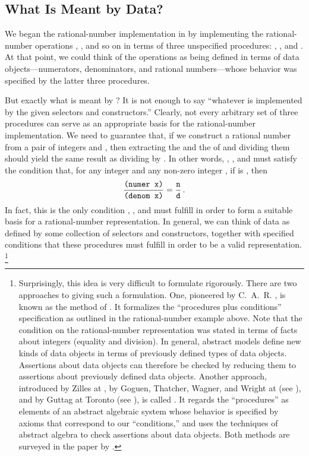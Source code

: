 \subsection{What Is Meant by Data?}
\label{Section 2.1.3}

We began the rational-number implementation in  by implementing the rational-number operations , , and so on in terms of three unspecified procedures:
, , and .
At that point, we could think of the operations as being defined in terms of data objects---numerators, denominators, and rational numbers---whose behavior was specified by the latter three procedures.

But exactly what is meant by ?
It is not enough to say “whatever is implemented by the given selectors and constructors.”
Clearly, not every arbitrary set of three procedures can serve as an appropriate basis for the rational-number implementation.
We need to guarantee that, if we construct a rational number  from a pair of integers  and , then extracting the  and the  of  and dividing them should yield the same result as dividing  by .
In other words, , , and  must satisfy the condition that, for any integer  and any non-zero integer , if  is , then
\[
	\frac{\texttt{(numer x)}}{\texttt{(denom x)}}
	=
	\frac{\texttt{n}}{\texttt{d}} \,.
\]
In fact, this is the only condition , , and  must fulfill in order to form a suitable basis for a rational-number representation.
In general, we can think of data as defined by some collection of selectors and constructors, together with specified conditions that these procedures must fulfill in order to be a valid representation.%
\footnote{
	Surprisingly, this idea is very difficult to formulate rigorously.
	There are two approaches to giving such a formulation.
	One, pioneered by C.~A.~R. , is known as the method of .
	It formalizes the “procedures plus conditions” specification as outlined in the rational-number example above.
	Note that the condition on the rational-number representation was stated in terms of facts about integers (equality and division).
	In general, abstract models define new kinds of data objects in terms of previously defined types of data objects.
	Assertions about data objects can therefore be checked by reducing them to assertions about previously defined data objects.
	Another approach, introduced by Zilles at , by Goguen, Thatcher, Wagner, and Wright at  (see ), and by Guttag at Toronto (see ), is called .
	It regards the “procedures” as elements of an abstract algebraic system whose behavior is specified by axioms that correspond to our “conditions,” and uses the techniques of abstract algebra to check assertions about data objects.
	Both methods are surveyed in the paper by .
}

